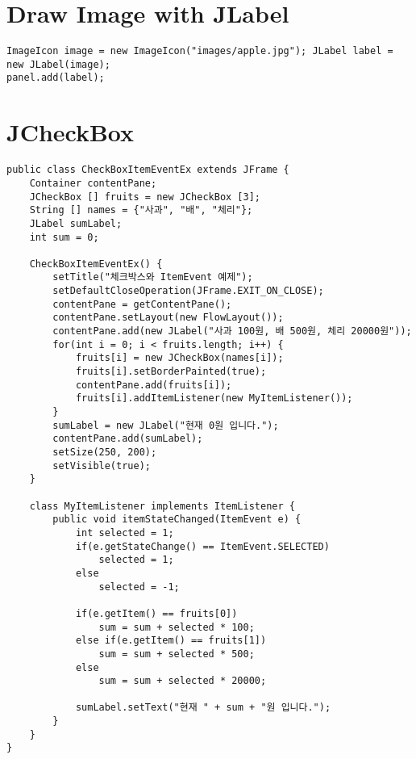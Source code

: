 \section{Draw Image with JLabel}
\begin{verbatim}
ImageIcon image = new ImageIcon("images/apple.jpg"); JLabel label = new JLabel(image);
panel.add(label);
\end{verbatim}

\section{JCheckBox}
\begin{verbatim}
public class CheckBoxItemEventEx extends JFrame {
	Container contentPane;
	JCheckBox [] fruits = new JCheckBox [3];
	String [] names = {"사과", "배", "체리"};
	JLabel sumLabel;
	int sum = 0;

	CheckBoxItemEventEx() {
		setTitle("체크박스와 ItemEvent 예제");
		setDefaultCloseOperation(JFrame.EXIT_ON_CLOSE);
		contentPane = getContentPane();
		contentPane.setLayout(new FlowLayout());						
		contentPane.add(new JLabel("사과 100원, 배 500원, 체리 20000원"));
		for(int i = 0; i < fruits.length; i++) {
			fruits[i] = new JCheckBox(names[i]);
			fruits[i].setBorderPainted(true);
			contentPane.add(fruits[i]);
			fruits[i].addItemListener(new MyItemListener());
		}
		sumLabel = new JLabel("현재 0원 입니다.");
		contentPane.add(sumLabel);
		setSize(250, 200);
		setVisible(true);
	}
	
	class MyItemListener implements ItemListener {
		public void itemStateChanged(ItemEvent e) {
			int selected = 1;
			if(e.getStateChange() == ItemEvent.SELECTED)
				selected = 1;
			else
				selected = -1;
			
			if(e.getItem() == fruits[0]) 
				sum = sum + selected * 100;
			else if(e.getItem() == fruits[1]) 
				sum = sum + selected * 500;
			else
				sum = sum + selected * 20000;

			sumLabel.setText("현재 " + sum + "원 입니다.");
		}
	}
}
\end{verbatim}

